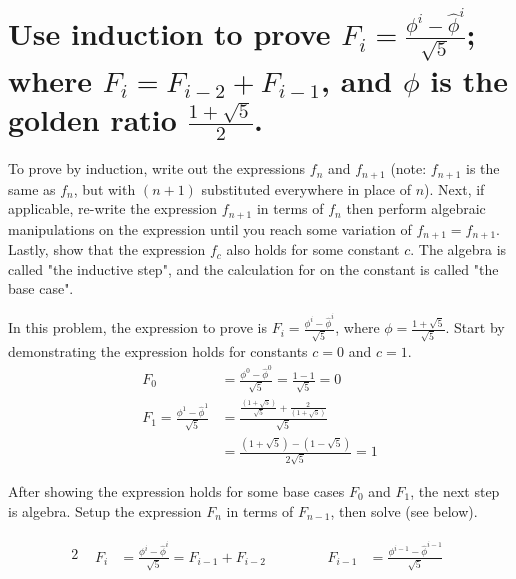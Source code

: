 \section[Problem 2]{Use induction to prove $F_i = \frac{\phi^i - \hat{\phi}^i}{\sqrt{5}}$; where $F_i = F_{i-2} + F_{i-1}$, and $\phi$ is the golden ratio $\frac{1 + \sqrt{5}}{2}$.}

To prove by induction, write out the expressions $f_n$ and $f_{n + 1}$ (note: $f_{n + 1}$ is the same as $f_n$, but with $(n + 1)$ substituted everywhere in place of $n$). Next, if applicable, re-write the expression $f_{n + 1}$ in terms of $f_n$ then perform algebraic manipulations on the expression until you reach some variation of $f_{n + 1} = f_{n + 1}$.  Lastly, show that the expression $f_c$ also holds for some constant $c$. The algebra is called "the inductive step", and the calculation for on the constant is called "the base case".

In this problem, the expression to prove is $F_i = \frac{\phi^i - \hat{\phi}^i}{\sqrt{5}}$, where $\phi = \frac{1 + \sqrt{5}}{\sqrt{5}}$. Start by demonstrating the expression holds for constants $c = 0$ and $c = 1$.
\begin{align*}
	F_0 &= \frac{\phi^0 - \hat{\phi}^0}{\sqrt{5}} = \frac{1 - 1}{\sqrt{5}} = 0 \\
	F_1 = \frac{\phi^1 - \hat{\phi}^1}{\sqrt{5}} &= \frac{\frac{\left( 1 + \sqrt{5} \right)}{\sqrt{5}} + \frac{2}{\left( 1 + \sqrt{5} \right)}}{\sqrt{5}} \\
	&= 
	\frac{\left( 1 + \sqrt{5} \right) - \left( 1 - \sqrt{5} \right)}{2 \sqrt{5}} = 1
\end{align*}

After showing the expression holds for some base cases $F_0$ and $F_1$, the next step is algebra. Setup the expression $F_n$ in terms of $F_{n - 1}$, then solve (see below). 

\setcounter{equation}{0}
\begin{alignat*}{2}
	&
	\begin{aligned}
		F_i &= \frac{\phi^i - \hat{\phi}^i}{\sqrt{5}} = F_{i - 1} + F_{i - 2}
	\end{aligned}
	& \qquad &
	\begin{aligned}
		F_{i - 1} &= \frac{\phi^{i - 1} - \hat{\phi}^{i - 1}}{\sqrt{5}}
	\end{aligned}
\end{alignat*}

